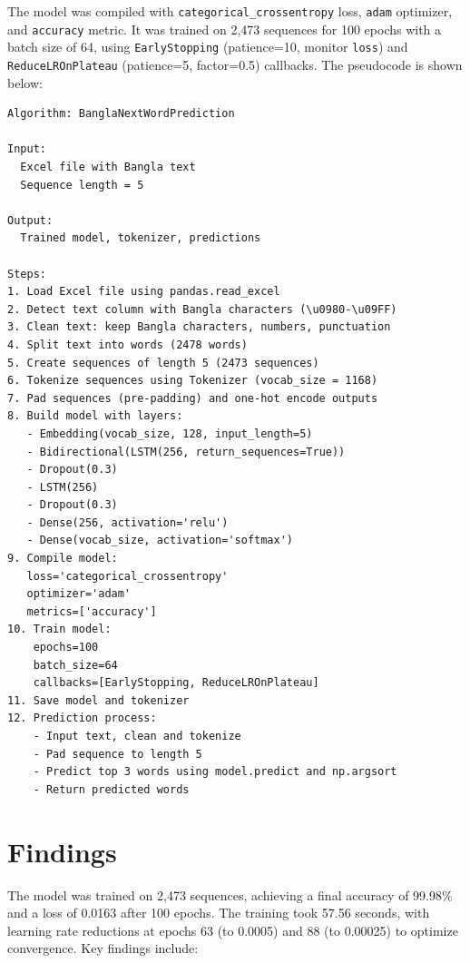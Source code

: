 \documentclass[12pt]{article}
\begin{document}
The model was compiled with \texttt{categorical\_crossentropy} loss, \texttt{adam} optimizer, and \texttt{accuracy} metric. It was trained on 2,473 sequences for 100 epochs with a batch size of 64, using \texttt{EarlyStopping} (patience=10, monitor \texttt{loss}) and \texttt{ReduceLROnPlateau} (patience=5, factor=0.5) callbacks. The pseudocode is shown below:

\begin{lstlisting}
Algorithm: BanglaNextWordPrediction

Input: 
  Excel file with Bangla text
  Sequence length = 5

Output: 
  Trained model, tokenizer, predictions

Steps:
1. Load Excel file using pandas.read_excel
2. Detect text column with Bangla characters (\u0980-\u09FF)
3. Clean text: keep Bangla characters, numbers, punctuation
4. Split text into words (2478 words)
5. Create sequences of length 5 (2473 sequences)
6. Tokenize sequences using Tokenizer (vocab_size = 1168)
7. Pad sequences (pre-padding) and one-hot encode outputs
8. Build model with layers:
   - Embedding(vocab_size, 128, input_length=5)
   - Bidirectional(LSTM(256, return_sequences=True))
   - Dropout(0.3)
   - LSTM(256)
   - Dropout(0.3)
   - Dense(256, activation='relu')
   - Dense(vocab_size, activation='softmax')
9. Compile model: 
   loss='categorical_crossentropy'
   optimizer='adam'
   metrics=['accuracy']
10. Train model: 
    epochs=100
    batch_size=64
    callbacks=[EarlyStopping, ReduceLROnPlateau]
11. Save model and tokenizer
12. Prediction process:
    - Input text, clean and tokenize
    - Pad sequence to length 5
    - Predict top 3 words using model.predict and np.argsort
    - Return predicted words
\end{lstlisting}

\section*{Findings}
The model was trained on 2,473 sequences, achieving a final accuracy of 99.98\% and a loss of 0.0163 after 100 epochs. The training took 57.56 seconds, with learning rate reductions at epochs 63 (to 0.0005) and 88 (to 0.00025) to optimize convergence. Key findings include:
\end{document}
